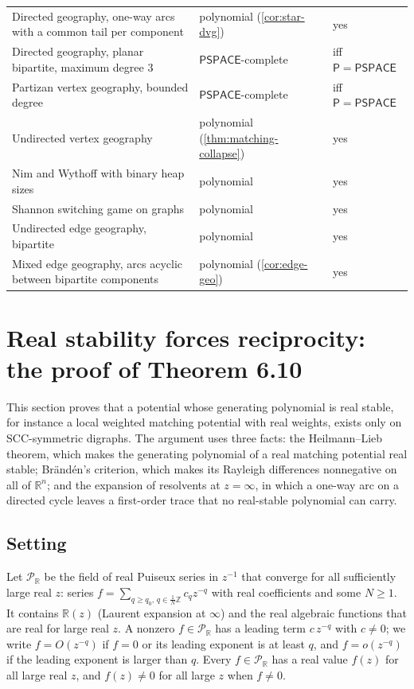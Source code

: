 \documentclass[final]{siamart0516}
\numberwithin{theorem}{section}
\numberwithin{equation}{section}
\theoremstyle{siamnonum}
\theoremstyle{plain}
\newcommand{\ZZ}{\mathbb{Z}}
\newcommand{\RR}{\mathbb{R}}
\newcommand{\Rz}{\RR(z)}
\newcommand{\Puis}{\mathcal{P}_{\RR}}
\newcommand{\cls}[1]{\mathsf{#1}}
\newcommand{\PSPACE}{\cls{PSPACE}}
\newcommand{\Pclass}{\cls{P}}
\begin{document}
\begin{center}
\begin{longtable}{@{}L{0.36}L{0.32}L{0.25}@{}}
Directed geography, one-way arcs with a common tail per component & polynomial (\cref{cor:star-dvg}) & yes\\
Directed geography, planar bipartite, maximum degree $3$ & $\PSPACE$-complete & iff $\Pclass=\PSPACE$\\
Partizan vertex geography, bounded degree & $\PSPACE$-complete & iff $\Pclass=\PSPACE$\\
Undirected vertex geography & polynomial (\cref{thm:matching-collapse}) & yes\\
Nim and Wythoff with binary heap sizes & polynomial \cite{Bouton,Wythoff} & yes\\
Shannon switching game on graphs & polynomial \cite{Lehman,EdmondsPartition} & yes\\
Undirected edge geography, bipartite & polynomial \cite{FSU} & yes\\
Mixed edge geography, arcs acyclic between bipartite components & polynomial (\cref{cor:edge-geo}) & yes\\
\bottomrule
\end{longtable}
\end{center}

\section{Real stability forces reciprocity: the proof of Theorem 6.10}\label{sec:realstab}

This section proves that a potential whose generating polynomial is real stable, for instance a local weighted matching potential with real weights, exists only on SCC-symmetric digraphs. The argument uses three facts: the Heilmann--Lieb theorem, which makes the generating polynomial of a real matching potential real stable; Br\"and\'en's criterion, which makes its Rayleigh differences nonnegative on all of $\RR^n$; and the expansion of resolvents at $z=\infty$, in which a one-way arc on a directed cycle leaves a first-order trace that no real-stable polynomial can carry.

\subsection{Setting}\label{ssec:real-setting}
Let $\Puis$ be the field of real Puiseux series in $z^{-1}$ that converge for all sufficiently large real $z$: series $f=\sum_{q\ge q_0,\,q\in\frac1N\ZZ}c_qz^{-q}$ with real coefficients and some $N\ge1$. It contains $\Rz$ (Laurent expansion at $\infty$) and the real algebraic functions that are real for large real $z$. A nonzero $f\in\Puis$ has a leading term $c\,z^{-q}$ with $c\neq0$; we write $f=O(z^{-q})$ if $f=0$ or its leading exponent is at least $q$, and $f=o(z^{-q})$ if the leading exponent is larger than $q$. Every $f\in\Puis$ has a real value $f(z)$ for all large real $z$, and $f(z)\neq0$ for all large $z$ when $f\ne0$.
\end{document}
